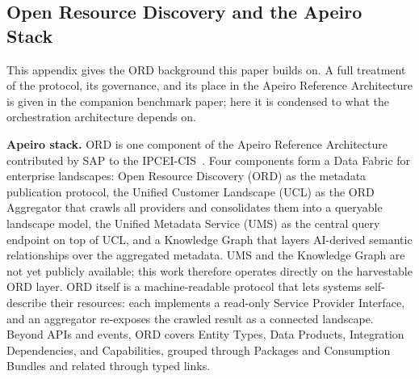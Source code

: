 
\subsection{Open Resource Discovery and the Apeiro Stack}
\label{appendix:ord-protocol}

This appendix gives the ORD background this paper builds on. A full treatment of the protocol, its governance, and its place in the Apeiro Reference Architecture is given in the companion benchmark paper; here it is condensed to what the orchestration architecture depends on.

\textbf{Apeiro stack.} ORD is one component of the Apeiro Reference Architecture contributed by SAP to the IPCEI-CIS~\cite{sap_se_apeiro_2026}. Four components form a Data Fabric for enterprise landscapes: Open Resource Discovery (ORD) as the metadata publication protocol, the Unified Customer Landscape (UCL) as the ORD Aggregator that crawls all providers and consolidates them into a queryable landscape model, the Unified Metadata Service (UMS) as the central query endpoint on top of UCL, and a Knowledge Graph that layers AI-derived semantic relationships over the aggregated metadata. UMS and the Knowledge Graph are not yet publicly available; this work therefore operates directly on the harvestable ORD layer. ORD itself is a machine-readable protocol that lets systems self-describe their resources: each implements a read-only Service Provider Interface, and an aggregator re-exposes the crawled result as a connected landscape. Beyond APIs and events, ORD covers Entity Types, Data Products, Integration Dependencies, and Capabilities, grouped through Packages and Consumption Bundles and related through typed links.

